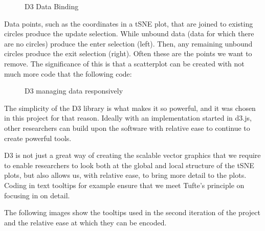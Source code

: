 \documentclass[a4paper,11pt,titlepage]{article}
\begin{document}
	\begin{figure}[H]
    			\caption{D3 Data Binding}%
	\end{figure}	
	
	Data points, such as the coordinates in a tSNE plot, that are joined to existing circles produce the update selection. While unbound data (data for which there are no circles) produce the enter selection (left). Then, any remaining unbound circles produce the exit selection (right). Often these are the points we want to remove. The significance of this is that a scatterplot can be created with not much more code that the following code:
	
	\begin{figure}[H]
    			\caption{D3 managing data responsively}%
	\end{figure}	
	
	The simplicity of the D3 library is what makes it so powerful, and it was chosen in this project for that reason. Ideally with an implementation started in d3.js, other researchers can build upon the software with relative ease to continue to create powerful tools. 
	\par 
	D3 is not just a great way of creating the scalable vector graphics that we require to enable researchers to look both at the global and local structure of the tSNE plots, but also allows us, with relative ease, to bring more detail to the plots. Coding in text tooltips for example ensure that we meet Tufte's principle on focusing in on detail. 
	\par 
	The following images show the tooltips used in the second iteration of the project and the relative ease at which they can be encoded.
	
\end{document}
